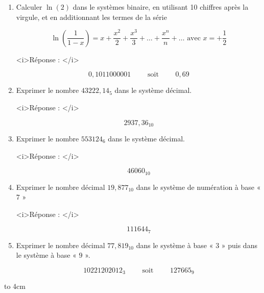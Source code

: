\begin{enumerate} [label=\arabic*$^\circ$]
\item Calculer $\ln(2)$ dans le systèmes binaire, en utilisant 10 chiffres après la virgule, et en additionnant les termes de la série 

\[ \ln \left(\dfrac{1}{1-x}\right) = x + \dfrac{x^2}{2} + \dfrac{x^3}{3} + \ldots + \dfrac{x^n}{n} + \ldots \text{ avec } x = + \dfrac{1}{2}
 \]

<i>Réponse : </i>


\[ 0,1011000001 \qquad \text{ soit } \qquad 0,69 \] 

\item Exprimer le nombre $43222,14_5$ dans le système décimal. 

<i>Réponse : </i>

\[2937,36_{10} \]

\item Exprimer le nombre $553124_6$ dans le système décimal. 

<i>Réponse : </i>
 
 \[ 46060_{10} \]

\item Exprimer le nombre décimal $19,877_{10}$ dans le système de numération à base « $7$ » 

<i>Réponse : </i>
 
 \[ 111644_7 \]
 
 \item Exprimer le nombre décimal $77,819_{10}$ dans le système à base « $3$ » puis dans le système à base « $9$ ». 
 
 \[ 10221202012_3 \qquad \text{ soit } \qquad 127665_9 \] 

\end{enumerate}


\centerline { \hfill \hbox to 4cm  { \hrulefill } \hfill }

\medskip 

\ifdefined\COMPLETE
\else
    
\fi

